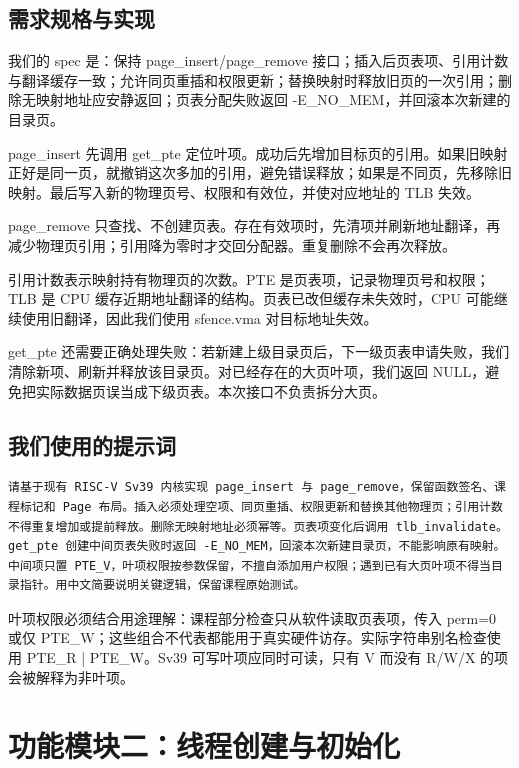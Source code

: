 \documentclass[UTF8,a4paper,10pt]{ctexart}
\begin{document}
\subsection{需求规格与实现}

我们的 spec 是：保持 page\_insert/page\_remove 接口；插入后页表项、引用计数与翻译缓存一致；允许同页重插和权限更新；替换映射时释放旧页的一次引用；删除无映射地址应安静返回；页表分配失败返回 -E\_NO\_MEM，并回滚本次新建的目录页。


page\_insert 先调用 get\_pte 定位叶项。成功后先增加目标页的引用。如果旧映射正好是同一页，就撤销这次多加的引用，避免错误释放；如果是不同页，先移除旧映射。最后写入新的物理页号、权限和有效位，并使对应地址的 TLB 失效。


page\_remove 只查找、不创建页表。存在有效项时，先清项并刷新地址翻译，再减少物理页引用；引用降为零时才交回分配器。重复删除不会再次释放。


引用计数表示映射持有物理页的次数。PTE 是页表项，记录物理页号和权限；TLB 是 CPU 缓存近期地址翻译的结构。页表已改但缓存未失效时，CPU 可能继续使用旧翻译，因此我们使用 sfence.vma 对目标地址失效。


get\_pte 还需要正确处理失败：若新建上级目录页后，下一级页表申请失败，我们清除新项、刷新并释放该目录页。对已经存在的大页叶项，我们返回 NULL，避免把实际数据页误当成下级页表。本次接口不负责拆分大页。


\subsection{我们使用的提示词}

\begin{lstlisting}
请基于现有 RISC-V Sv39 内核实现 page_insert 与 page_remove，保留函数签名、课程标记和 Page 布局。插入必须处理空项、同页重插、权限更新和替换其他物理页；引用计数不得重复增加或提前释放。删除无映射地址必须幂等。页表项变化后调用 tlb_invalidate。get_pte 创建中间页表失败时返回 -E_NO_MEM，回滚本次新建目录页，不能影响原有映射。中间项只置 PTE_V，叶项权限按参数保留，不擅自添加用户权限；遇到已有大页叶项不得当目录指针。用中文简要说明关键逻辑，保留课程原始测试。
\end{lstlisting}

叶项权限必须结合用途理解：课程部分检查只从软件读取页表项，传入 perm=0 或仅 PTE\_W；这些组合不代表都能用于真实硬件访存。实际字符串别名检查使用 PTE\_R | PTE\_W。Sv39 可写叶项应同时可读，只有 V 而没有 R/W/X 的项会被解释为非叶项。


\section{功能模块二：线程创建与初始化}
\end{document}
